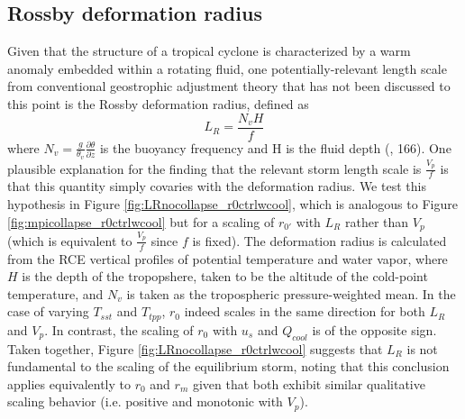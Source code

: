 \documentclass[12pt]{article}
\begin{document}
\subsection{Rossby deformation radius}
Given that the structure of a tropical cyclone is characterized by a warm anomaly embedded within a rotating fluid, one potentially-relevant length scale from conventional geostrophic adjustment theory that has not been discussed to this point is the Rossby deformation radius, defined as
\begin{equation}
	L_R = \frac{N_vH}{f}
\end{equation}
where $N_v = \frac{g}{\theta_v}\frac{\partial{\theta}}{\partial z}$ is the buoyancy frequency and H is the fluid depth (\cite{Emanuel_1994}, 166).  One plausible explanation for the finding that the relevant storm length scale is $\frac{V_p}{f}$ is that this quantity simply covaries with the deformation radius.  We test this hypothesis in Figure \ref{fig:LRnocollapse_r0ctrlwcool}, which is analogous to Figure \ref{fig:mpicollapse_r0ctrlwcool} but for a scaling of $r_{0'}$ with $L_R$ rather than $V_p$ (which is equivalent to $\frac{V_p}{f}$ since $f$ is fixed).  The deformation radius is calculated from the RCE vertical profiles of potential temperature and water vapor, where $H$ is the depth of the tropopshere,  taken to be the altitude of the cold-point temperature, and $N_v$ is taken as the tropospheric pressure-weighted mean.  In the case of varying $T_{sst}$ and $T_{tpp}$, $r_0$ indeed scales in the same direction for both $L_R$ and $V_p$.  In contrast, the scaling of $r_0$ with $u_s$ and $Q_{cool}$ is of the opposite sign. Taken together, Figure \ref{fig:LRnocollapse_r0ctrlwcool} suggests that $L_R$ is not fundamental to the scaling of the equilibrium storm, noting that this conclusion applies equivalently to $r_0$ and $r_m$ given that both exhibit similar qualitative scaling behavior (i.e. positive and monotonic with $V_p$).
\end{document}
